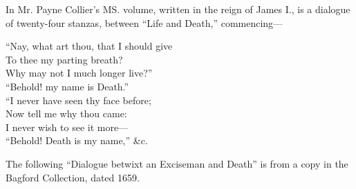 In Mr. Payne Collier’s MS. volume, written in the reign of James I., is a
dialogue of twenty-four stanzas, between “Life and Death,” commencing—
\settowidth{\versewidth}{Nay, what art thou, that I should give}
\begin{scverse}“Nay, what art thou, that I should give\\
\vin To thee my parting breath?\\
Why may not I much longer live?”\\
\vin “Behold! my name is Death.”\\
“I never have seen thy face before;\\
\vin Now tell me why thou came:\\
I never wish to see it more—\\
\vin “Behold! Death is my name,” \&c.
\end{scverse}

The following “Dialogue betwixt an Exciseman and Death” is from a copy in
the Bagford Collection, dated 1659.

